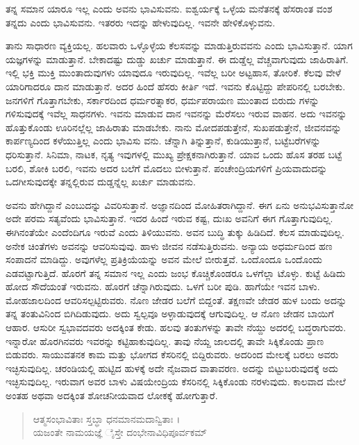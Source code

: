 ತನ್ನ ಸಮಾನ ಯಾರೂ ಇಲ್ಲ ಎಂದು ಅವನು ಭಾವಿಸುವನು. ಐಶ್ವರ್ಯಕ್ಕೆ ಒಳ್ಳೆಯ ಮನೆತನಕ್ಕೆ ಹೆಸರಾಂತ ವಂಶ ತನ್ನದು ಎಂದು ಭಾವಿಸುವನು. ಇತರರು ಇದನ್ನು ಹೇಳುವುದಿಲ್ಲ. ಇವನೇ ಹೇಳಿಕೊಳ್ಳುವನು.

ತಾನು ಸಾಧಾರಣ ವ್ಯಕ್ತಿಯಲ್ಲ. ಹಲವಾರು ಒಳ್ಳೊಳ್ಳೆಯ ಕೆಲಸವನ್ನು ಮಾಡುತ್ತಿರುವವನು ಎಂದು ಭಾವಿಸುತ್ತಾನೆ. ಯಾಗ ಯಜ್ಞಗಳನ್ನು ಮಾಡುತ್ತಾನೆ. ಬೇಕಾದಷ್ಟು ದುಡ್ಡು ಖರ್ಚು ಮಾಡುತ್ತಾನೆ. ಈ ದುಡ್ಡೆಲ್ಲ ವೆಚ್ಚವಾಗುವುದು ಜಾಹಿರಾತಿಗೆ. ಇಲ್ಲಿ ಭಕ್ತಿ ಮುಕ್ತಿ ಮುಂತಾದುವುಗಳು ಯಾವುದೂ ಇರುವುದಿಲ್ಲ. ಇವೆಲ್ಲ ಬರೀ ಅಟ್ಟಹಾಸ, ತೋರಿಕೆ. ಕೆಲವು ವೇಳೆ ಯಾರಿಗಾದರೂ ದಾನ ಮಾಡುತ್ತಾನೆ. ಅದರ ಹಿಂದೆ ಹೆಸರು ಕೀರ್ತಿ ಇದೆ. ಇವನು ಕೊಟ್ಟಿದ್ದು ಪೇಪರಿನಲ್ಲಿ ಬರಬೇಕು. ಜನಗಳಿಗೆ ಗೊತ್ತಾಗಬೇಕು, ಸರ್ಕಾರದಿಂದ ಧರ್ಮರತ್ನಾಕರ, ಧರ್ಮಪರಾಯಣ ಮುಂತಾದ ಬಿರುದು ಗಳನ್ನು ಗಳಿಸುವುದಕ್ಕೆ ಇವೆಲ್ಲ ಸಾಧನಗಳು. ಇವನು ಮಾಡುವ ದಾನ ಇವನನ್ನು ಮೆರೆಸಲು ಇರುವ ವಾಹನ. ಅದು ಇವನನ್ನು ಹೊತ್ತುಕೊಂಡು ಊರಿನಲ್ಲೆಲ್ಲ ಜಾಹಿರಾತು ಮಾಡಬೇಕು. ನಾನು ಮೋದಪಡುತ್ತೇನೆ, ಸುಖಪಡುತ್ತೇನೆ, ಜೀವನವನ್ನು ಕಾರ್ಪಣ್ಯದಿಂದ ಕಳೆಯುತ್ತಿಲ್ಲ ಎಂದು ಭಾವಿಸು ವನು. ಚೆನ್ನಾಗಿ ತಿನ್ನುತ್ತಾನೆ, ಕುಡಿಯುತ್ತಾನೆ, ಬಟ್ಟೆಬರೆಗಳನ್ನು ಧರಿಸುತ್ತಾನೆ. ಸಿನಿಮಾ, ನಾಟಕ, ನೃತ್ಯ ಇವುಗಳಲ್ಲಿ ಮುಖ್ಯ ಪ್ರೇಕ್ಷಕನಾಗಿರುತ್ತಾನೆ. ಯಾವ ಒಂದು ಹೊಸ ತರಹ ಬಟ್ಟೆ ಬರಲಿ, ಶೋಕಿ ಬರಲಿ, ಇವನು ಅದರ ಬಲೆಗೆ ಮೊದಲು ಬೀಳುತ್ತಾನೆ. ಪಂಚೇಂದ್ರಿಯಗಳಿಗೆ ಪ್ರಿಯವಾದುದನ್ನು ಒದಗೀಸುವುದಕ್ಕೇ ತನ್ನಲ್ಲಿರುವ ದುಡ್ಡನ್ನೆಲ್ಲ ಖರ್ಚು ಮಾಡುವನು.

ಅವನು ಹೇಗಿದ್ದಾನೆ ಎಂಬುದನ್ನು ವಿವರಿಸುತ್ತಾನೆ. ಅಜ್ಞಾನದಿಂದ ಮೋಹಿತರಾಗಿದ್ದಾನೆ. ಈಗ ಏನು ಅನುಭವಿಸುತ್ತಾನೋ ಅದೇ ಪರಮ ಸತ್ಯವೆಂದು ಭಾವಿಸುತ್ತಾನೆ. ಇದರ ಹಿಂದೆ ಇರುವ ಕಷ್ಟ, ದುಃಖ ಅವನಿಗೆ ಈಗ ಗೊತ್ತಾಗುವುದಿಲ್ಲ. ಈಗಿನಂತೆಯೇ ಎಂದೆಂದಿಗೂ ಇರುವೆ ಎಂದು ತಿಳಿಯುವನು. ಅವನ ಬುದ್ಧಿ ತುಕ್ಕು ಹಿಡಿದಿದೆ. ಕೆಲಸ ಮಾಡುವುದಿಲ್ಲ. ಅನೇಕ ಚಿಂತೆಗಳು ಅವನನ್ನು ಆವರಿಸುವುವು. ಹಾಳು ಜೀವನ ನಡೆಸುತ್ತಿರುವನು. ಅನ್ಯಾಯ ಅಧರ್ಮದಿಂದ ಹಣ ಸಂಪಾದನೆ ಮಾಡಿದ್ದು. ಅವುಗಳೆಲ್ಲ ಪ್ರತಿಕ್ರಿಯೆಯನ್ನು ಅವನ ಮೇಲೆ ಬೀರುತ್ತವೆ. ಒಂದೊಂದೂ ಒಂದೊಂದು ಎಡವಟ್ಟಾಗುತ್ತಿದೆ. ಹೊರಗೆ ತನ್ನ ಸಮಾನ ಇಲ್ಲ ಎಂದು ಜಂಭ ಕೊಚ್ಚಿಕೊಂಡರೂ ಒಳಗೆಲ್ಲಾ ಟೊಳ್ಳು. ಕುಟ್ಟೆ ಹಿಡಿದು ಹೋದ ಸೌದೆಯಂತೆ ಇರುವನು. ಹೊರಗೆ ಚೆನ್ನಾಗಿರುವುದು. ಒಳಗೆ ಬರೀ ಪುಡಿ. ಹಾಗೆಯೇ ಇವನ ಬಾಳು. ಮೋಹಜಾಲದಿಂದ ಆವರಿಸಲ್ಪಟ್ಟಿರುವರು. ನೊಣ ಜೇಡರ ಬಲೆಗೆ ಬಿದ್ದಂತೆ. ತಕ್ಷಣವೇ ಜೇಡರ ಹುಳ ಬಂದು ಅದನ್ನು ತನ್ನ ತಂತುವಿನಿಂದ ಬಿಗಿದಿಡುವುದು. ಅದು ಸ್ವಲ್ಪವೂ ಅಳ್ಳಾಡುವುದಕ್ಕೆ ಆಗುವುದಿಲ್ಲ. ಆ ನೊಣ ಜೇಡನ ಬಾಯಿಗೆ ಆಹಾರ. ಆಸುರೀ ಸ್ವಭಾವದವರು ಅದಕ್ಕಿಂತ ಕೇಡು. ಹಲವು ತಂತುಗಳನ್ನು ತಾವೇ ನೆಯ್ದು ಅದರಲ್ಲಿ ಬದ್ಧರಾಗುವರು. ಇನ್ನಾರೋ ಹೊರಗಿನವರು ಇವರನ್ನು ಕಟ್ಟಿಹಾಕುವುದಿಲ್ಲ. ತಾವು ನೆಯ್ದ ಜಾಲದಲ್ಲಿ ತಾವೇ ಸಿಕ್ಕಿಕೊಂಡು ಪ್ರಾಣ ಬಿಡುವರು. ಸಾಯುವತನಕ ಕಾಮ ಮತ್ತು ಭೋಗದ ಕೆಸರಿನಲ್ಲಿ ಬಿದ್ದಿರುವರು. ಅದರಿಂದ ಮೇಲಕ್ಕೆ ಬರಲು ಅವರು ಇಚ್ಛಿಸುವುದಿಲ್ಲ. ಚರಂಡಿಯಲ್ಲಿ ಹುಟ್ಟಿದ ಹುಳಕ್ಕೆ ಅದೇ ನೈಜವಾದ ವಾತಾವರಣ. ಅದನ್ನು ಬಿಟ್ಟುಬರುವುದಕ್ಕೆ ಅದು ಇಚ್ಛಿಸುವುದಿಲ್ಲ. ಇರುವಾಗ ಅವರ ಬಾಳು ವಿಷಯೇಂದ್ರಿಯ ಕೆಸರಿನಲ್ಲಿ ಸಿಕ್ಕಿಕೊಂಡು ನರಳುವುದು. ಕಾಲವಾದ ಮೇಲೆ ಅಂತಹ ಅಥವಾ ಅದಕ್ಕಿಂತ ಶೋಚನೀಯವಾದ ಲೋಕಕ್ಕೆ ಹೋಗುತ್ತಾರೆ.

\begin{verse}
ಆತ್ಮಸಂಭಾವಿತಾಃ ಸ್ತಬ್ಧಾ ಧನಮಾನಮದಾನ್ವಿತಾಃ ।\\ಯಜಂತೇ ನಾಮಯಜ್ಞೆ ೈಸ್ತೇ ದಂಭೇನಾವಿಧಿಪೂರ್ವಕಮ್ 
\end{verse}

